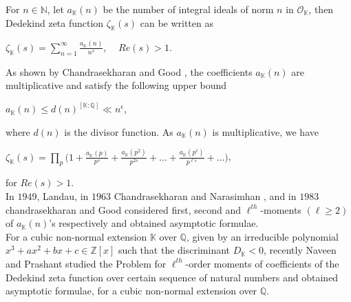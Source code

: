 \documentclass[preprint,12pt]{elsarticle}
\numberwithin{equation}{section}
\begin{document}
For $n\in \mathbb{N}$, let $a_{\mathbb{K}}(n)$ be the number of integral ideals of norm $n$ in $\mathcal{O}_{\mathbb{K}}$, then Dedekind zeta function $\zeta_{\mathbb{K}}(s)$ can be written as
\begin{center}
	$\zeta_{\mathbb{K}}(s)=\sum\limits_{n=1}^{\infty}\frac{a_{\mathbb{K}}(n)}{n^{s}},~~~~~Re(s)>1.$
\end{center}
As shown by Chandrasekharan and Good \cite{CKAG}, the coefficients $a_{\mathbb{K}}(n)$ are multiplicative and satisfy the following upper bound
\begin{center}
	$a_{\mathbb{K}}(n)\leq d(n)^{[\mathbb{K}:\mathbb{Q}]}\ll n^{\epsilon}$,
\end{center}
where $d(n)$ is the divisor function. As $a_{\mathbb{K}}(n)$ is multiplicative, we have
\begin{center}
	$\displaystyle \zeta_{\mathbb{K}}(s)=\prod\limits_{p}\Big(1+\frac{a_{\mathbb{K}}(p)}{p^{s}}+\frac{a_{\mathbb{K}}(p^{2})}{p^{2s}}+\dots+\frac{a_{\mathbb{K}}(p^{\ell})}{p^{\ell s}}+\dots\Big)$,
\end{center}
for $Re(s)>1$.\\
In $1949$, Landau\cite{Land}, in $1963$ Chandrasekharan and Narasimhan \cite{CKN} , and in $1983$ chandrasekharan and Good \cite{CKAG} considered first, second and $\ell^{th}$-moments $(\ell \geq 2)$ of $a_{\mathbb{K}}(n)$'s respectively and obtained asymptotic formulae.\\

For a cubic non-normal extension $\mathbb{K}$ over $\mathbb{Q}$, given by an irreducible polynomial $x^{3}+ax^{2}+bx+c\in \mathbb{Z}[x]$ such that the discriminant $D_{\mathbb{K}}<0$,
recently Naveen and Prashant \cite{P tiwari} studied the Problem for $\ell^{th}$-order moments of coefficients of the Dedekind zeta function over certain sequence of natural numbers and obtained asymptotic formulae, for a cubic non-normal extension over $\mathbb{Q}$.\\  
\end{document}
